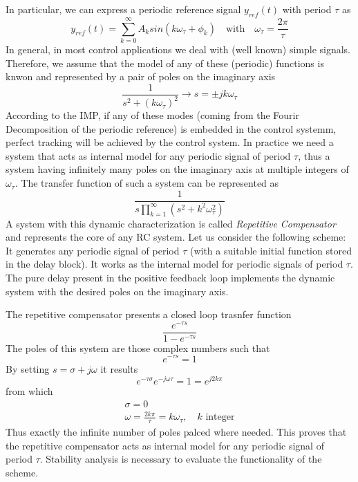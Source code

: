 \documentclass{book}
\begin{document}
In particular, we can express a periodic reference signal $y_{ref}(t)$ with period $\tau$ as 
\[
    y_{ref}(t) = \displaystyle\sum_{k=0}^{\infty}A_ksin(k\omega_\tau+\phi_k) \quad \text{with} \quad \omega_\tau=\displaystyle\frac{2\pi}{\tau}
\]
In general, in most control applications we deal with (well known) simple signals. Therefore, we assume that the model of any of these (periodic) functions is knwon and represented by a pair of poles on the imaginary axis 
\[
    \displaystyle\frac{1}{s^2+(k\omega_\tau)^2} \rightarrow s = \pm jk\omega_\tau
\]
According to the IMP, if any of these modes (coming from the Fourir Decomposition of the periodic reference) is embedded in the control systemm, perfect tracking will be achieved by the control system. In practice we need a system that acts as internal model for any periodic signal of period $\tau$, thus a system having infinitely many poles on the imaginary axis at multiple integers of $\omega_\tau$.
The transfer function of such a system can be represented as 
\[
    \displaystyle\frac{1}{s\prod_{k=1}^\infty (s^2+k^2\omega_\tau^2)}
\]
A system with this dynamic characterization is called \emph{Repetitive Compensator} and represents the core of any RC system. Let us consider the following scheme: 
It generates any periodic signal of period $\tau$ (with a suitable initial function stored in the delay block). It works as the internal model for periodic signals of period $\tau$. The pure delay present in the positive feedback loop implements the dynamic system with the desired poles on the imaginary axis. 

The repetitive compensator presents a closed loop trasnfer function 
\[
    \displaystyle\frac{e^{-\tau s}}{1-e^{-\tau s}}
\]
The poles of this system are those complex numbers such that 
\[
    e^{-\tau s} = 1 
\]
By setting $s = \sigma+j\omega$ it results 
\[
    e^{-\tau\sigma} e ^{-j \omega \tau} = 1 = e^{j2k\pi}
\]
from which 
\begin{align*}
    \sigma = 0 \\
    \omega = \displaystyle\frac{2k\pi}{\tau} = k \omega_\tau, \quad k \text{ integer}
\end{align*}
Thus exactly the infinite number of poles palced where needed. This proves that the repetitive compensator acts as internal model for any periodic signal of period $\tau$. Stability analysis is necessary to evaluate the functionality of the scheme. 
\end{document}
